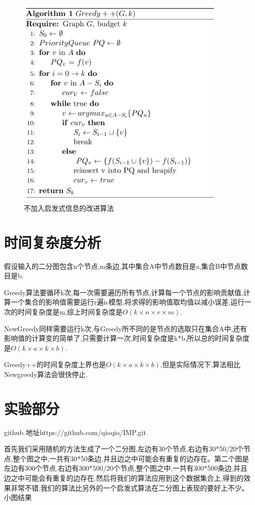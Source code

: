 \documentclass[11pt, a4paper]{article}
\begin{document}
  \begin{figure}[H]
    \centering\includegraphics[width=4in]{images/greedypp.png}
    \caption{不加入启发式信息的改进算法}\label{fig:greedypp}
  \end{figure}

  \section{时间复杂度分析}

  假设输入的二分图包含n个节点,m条边,其中集合A中节点数目是a,集合B中节点数目是b.

  Greedy算法要循环k次,每一次需要遍历所有节点,计算每一个节点的影响贡献值,计算一个集合的影响值需要运行r遍ic模型,将求得的影响值取均值以减小误差,运行一次的时间复杂度是m,综上时间复杂度是$O(k\times n\times r\times m)$.

  NewGreedy同样需要运行k次,与Greedy所不同的是节点的选取只在集合A中,还有影响值的计算变的简单了,只需要计算一次,时间复杂度是k*b,所以总的时间复杂度是$O(k\times a\times k\times b)$.

  Greedy++的时间复杂度上界也是$O(k\times a\times k\times b)$,但是实际情况下,算法相比Newgreedy算法会很快停止.

  \section{实验部分}

  github 地址https://github.com/qioqio/IMP.git

  首先我们采用随机的方法生成了一个二分图,左边有30个节点,右边有30*50/20个节点,整个图之中,一共有30*50条边,并且边之中可能会有重复的边存在。第二个图是左边有300个节点,右边有300*500/20个节点,整个图之中,一共有300*500条边,并且边之中可能会有重复的边存在.然后将我们的算法应用到这个数据集合上,得到的效果非常不错,我们的算法比另外的一个启发式算法在二分图上表现的要好上不少。
  小图结果
\end{document}
